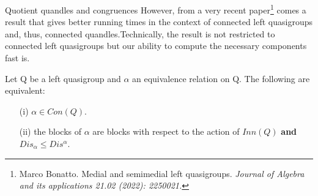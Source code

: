 \begin{frame}{Quotient quandles and congruences}
However, from a very recent paper\footnote{Marco Bonatto. Medial and semimedial left quasigroups. \emph{Journal of Algebra and its applications 21.02 (2022): 2250021.}} comes a result that gives better running times in the context of connected left quasigroups and, thus, connected quandles.\newline\newline Technically, the result is not restricted to connected left quasigroups but our ability to compute the necessary components fast is. 
\begin{lemma}
Let Q be a left quasigroup and $\alpha$ an equivalence relation on Q. The following are equivalent:
\begin{itemize}
    \item[(i)] $\alpha \in Con(Q)$.
    \item[(ii)] the blocks of $\alpha$ are blocks with respect to the action of $Inn(Q)$ \textbf{and} $Dis_\alpha \leq Dis^\alpha$.
\end{itemize}

\end{lemma}


\end{frame}


